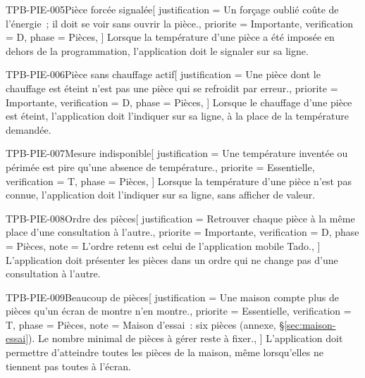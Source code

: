 \begin{exigence}{TPB-PIE-005}{Pièce forcée signalée}[
    justification = {Un forçage oublié coûte de l'énergie~; il doit se voir sans ouvrir la
                     pièce.},
    priorite      = {Importante},
    verification  = {D},
    phase         = {Pièces},
  ]
  Lorsque la température d'une pièce a été imposée en dehors de la programmation,
  l'application doit le signaler sur sa ligne.
\end{exigence}

\begin{exigence}{TPB-PIE-006}{Pièce sans chauffage actif}[
    justification = {Une pièce dont le chauffage est éteint n'est pas une pièce qui se
                     refroidit par erreur.},
    priorite      = {Importante},
    verification  = {D},
    phase         = {Pièces},
  ]
  Lorsque le chauffage d'une pièce est éteint, l'application doit l'indiquer sur sa
  ligne, à la place de la température demandée.
\end{exigence}

\begin{exigence}{TPB-PIE-007}{Mesure indisponible}[
    justification = {Une température inventée ou périmée est pire qu'une absence de
                     température.},
    priorite      = {Essentielle},
    verification  = {T},
    phase         = {Pièces},
  ]
  Lorsque la température d'une pièce n'est pas connue, l'application doit l'indiquer sur
  sa ligne, sans afficher de valeur.
\end{exigence}

\begin{exigence}{TPB-PIE-008}{Ordre des pièces}[
    justification = {Retrouver chaque pièce à la même place d'une consultation à l'autre.},
    priorite      = {Importante},
    verification  = {D},
    phase         = {Pièces},
    note          = {L'ordre retenu est celui de l'application mobile Tado.},
  ]
  L'application doit présenter les pièces dans un ordre qui ne change pas d'une
  consultation à l'autre.
\end{exigence}

\begin{exigence}{TPB-PIE-009}{Beaucoup de pièces}[
    justification = {Une maison compte plus de pièces qu'un écran de montre n'en montre.},
    priorite      = {Essentielle},
    verification  = {T},
    phase         = {Pièces},
    note          = {Maison d'essai~: six pièces (annexe, §\ref{sec:maison-essai}). Le
                     nombre minimal de pièces à gérer reste à fixer.},
  ]
  L'application doit permettre d'atteindre toutes les pièces de la maison, même lorsqu'elles
  ne tiennent pas toutes à l'écran.
\end{exigence}


